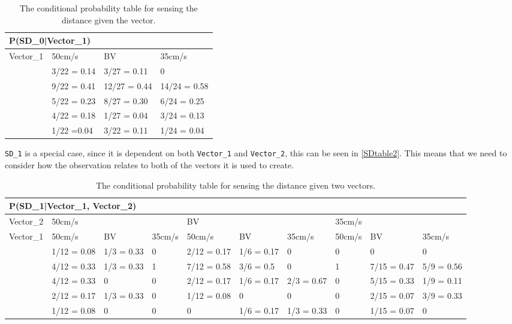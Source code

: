 \begin{center}
\begin{table}[H]
\begin{tabular}{|l|l|l|l|}
\hline
\multicolumn{4}{|l|}{P(SD\_0|Vector\_1)} \\ \hline
Vector\_1     & 50cm/s & BV & 35cm/s \\\hline 
[0 - 60]      & 3/22 = 0.14 & 3/27 = 0.11 & 0 \\ \hline 
[60 - 75]    & 9/22 = 0.41 & 12/27 = 0.44 & 14/24 = 0.58 \\ \hline
[75 - 90]   & 5/22 = 0.23 & 8/27 = 0.30 & 6/24 = 0.25 \\ \hline
[90 - 105]   & 4/22 = 0.18 & 1/27 = 0.04 & 3/24 = 0.13 \\ \hline
[105 - 255]   & 1/22 =0.04 & 3/22 = 0.11 & 1/24 = 0.04   \\ \hline
\end{tabular}
\caption{The conditional probability table for sensing the distance given the
vector.}
\label{SDtable}
\end{table}
\end{center}
  
\texttt{SD\_1} is a special case, since it is dependent on both
\texttt{Vector\_1} and \texttt{Vector\_2}, this can be seen in
\autoref{SDtable2}. This means that we need to consider how the observation
relates to both of the vectors it is used to create.

\begin{table}[H]
\centering
\begin{tabular}{|l|p{1.2cm}|p{1.2cm}|l|p{1.2cm}|p{1.2cm}|p{1.2cm}|l|p{1.2cm}|p{1.2cm}|}
\hline
\multicolumn{10}{|l|}{P(SD\_1|Vector\_1, Vector\_2)} \\\hline 
Vector\_2 & \multicolumn{3}{l|}{50cm/s} & \multicolumn{3}{l|}{BV} &
\multicolumn{3}{l|}{35cm/s}\\\hline 
Vector\_1 & 50cm/s      &  BV     & 35cm/s      & 50cm/s      & BV      & 35cm/s     
& 50cm/s & BV & 35cm/s \\\hline
[0-60]&1/12 = 0.08 & 1/3 = 0.33 & 0      & 2/12 = 0.17 & 1/6 = 0.17 & 0 & 0  
& 0 & 0 \\ \hline
[60-75]&4/12 = 0.33 & 1/3 = 0.33 & 1      & 7/12 = 0.58 & 3/6 = 0.5 & 0      & 1     
& 7/15 = 0.47 & 5/9 = 0.56\\ \hline
[75-90] & 4/12 = 0.33 & 0 & 0 & 2/12 = 0.17 & 1/6 = 0.17 & 2/3 = 0.67 & 0 
& 5/15 = 0.33 &1/9 = 0.11\\\hline
[90-105] & 2/12 = 0.17 & 1/3 = 0.33 & 0 & 1/12 = 0.08 & 0 & 0 & 0 
& 2/15 = 0.07  & 3/9 = 0.33\\\hline
[105-255] & 1/12 = 0.08 & 0 & 0 & 0 & 1/6 = 0.17 & 1/3 = 0.33 & 0 & 1/15 = 0.07     
&0\\\hline
\end{tabular}
\caption{The conditional probability table for sensing the distance given two
vectors.}
\label{SDtable2}
\end{table}

